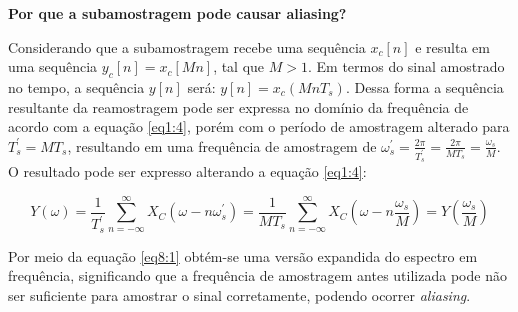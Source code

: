 \textbf{Por que a subamostragem pode causar aliasing?}

Considerando que a subamostragem recebe uma sequência $x_c[n]$ e resulta em uma sequência $y_c[n] = x_c[Mn]$, tal que $M>1$. Em termos do sinal amostrado no tempo, a sequência $y[n]$ será: $y[n] = x_c(MnT_s)$. Dessa forma a sequência resultante da reamostragem pode ser expressa no domínio da frequência de acordo com a equação \ref{eq1:4}, porém com o período de amostragem alterado para $T_s^{'} = MT_s$, resultando em uma frequência de amostragem de $\omega_s^{'} = \frac{2\pi}{T_s^{'}} = \frac{2\pi}{MT_s} = \frac{\omega_s}{M}$. O resultado pode ser expresso alterando a equação \ref{eq1:4}:

\begin{equation} \label{eq8:1}
    Y(\omega) = \frac{1}{T_s^{'}} \sum_{n=-\infty}^{\infty} X_C(\omega - n\omega_s^{'}) = \frac{1}{MT_s} \sum_{n=-\infty}^{\infty} X_C\left(\omega - n\frac{\omega_s}{M}\right) = Y\left(\frac{\omega_s}{M}\right)
\end{equation}

Por meio da equação \ref{eq8:1} obtém-se uma versão expandida do espectro em frequência, significando que a frequência de amostragem antes utilizada pode não ser suficiente para amostrar o sinal corretamente, podendo ocorrer \textit{aliasing}.